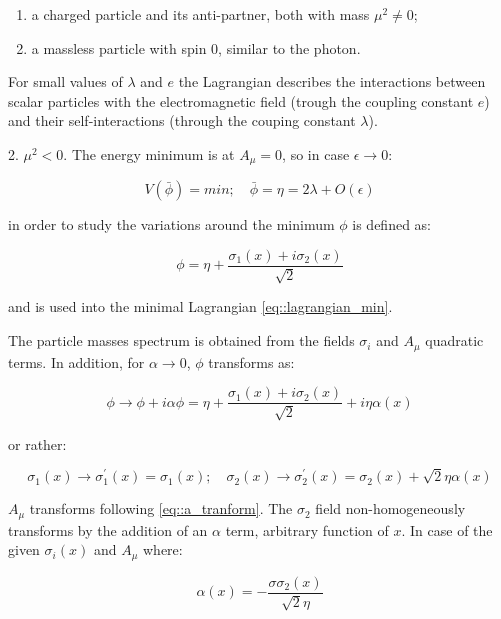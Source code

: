 \begin{enumerate}
	\item a charged particle and its anti-partner, both with mass $\mu^{2} \neq 0$;
	\item a massless particle with spin 0, similar to the photon.
\end{enumerate}

For small values of $\lambda$ and $e$ the Lagrangian describes the interactions between scalar particles with the electromagnetic field (trough the coupling constant $e$) and their self-interactions (through the couping constant $\lambda$).

2. $\mu^{2} < 0$. The energy minimum is at $A_{\mu} = 0$, so in  case $\epsilon \rightarrow 0$:

\begin{equation}
V(\bar{\phi})=min ; \quad \bar{\phi}=\eta= 2\lambda +O(\epsilon)
\end{equation}
 
 in order to study the  variations around the minimum $\phi$ is defined as:

\begin{equation}
 \phi=\eta + \dfrac{\sigma_{1}(x) + i\sigma_{2}(x)}{\sqrt{2}} 
\end{equation}

and is used into the minimal Lagrangian \ref{eq::lagrangian_min}.

The particle masses spectrum is obtained from the fields $\sigma_{i}$ and $A_{\mu}$ quadratic terms. In addition, for $\alpha \rightarrow 0$, $\phi$ transforms as:

\begin{equation}
\phi \rightarrow \phi + i\alpha\phi = \eta + \dfrac{\sigma_{1}(x) + i\sigma_{2}(x)}{\sqrt{2}} + i\eta\alpha(x)
\end{equation}

or rather:

\begin{equation}
\sigma_{1}(x) \rightarrow \sigma^{\prime}_{1}(x) = σ_{1}(x); \quad \sigma_{2}(x) \rightarrow \sigma^{\prime}_{2}(x) = \sigma_{2}(x) + \sqrt{2}\eta\alpha(x)
\end{equation}

$A_{\mu}$ transforms following \ref{eq::a_tranform}. The $\sigma_{2}$ field non-homogeneously transforms by the addition of an $\alpha$ term, arbitrary function of $x$. In case of the given $\sigma_{i}(x)$ and $A_{\mu}$ where:

\begin{equation}
\alpha(x) = -\dfrac{σ\sigma_{2}(x)}{\sqrt{2}\eta}
\end{equation}

